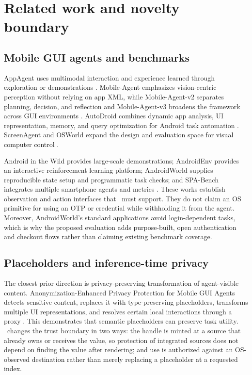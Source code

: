 \section{Related work and novelty boundary}
\label{sec:related}

\subsection{Mobile GUI agents and benchmarks}

AppAgent uses multimodal interaction and experience learned through exploration or demonstrations \cite{zhang2023appagent}. Mobile-Agent emphasizes vision-centric perception without relying on app XML, while Mobile-Agent-v2 separates planning, decision, and reflection and Mobile-Agent-v3 broadens the framework across GUI environments \cite{wang2024mobileagent,wang2024mobileagentv2,ye2025mobileagentv3}. AutoDroid combines dynamic app analysis, UI representation, memory, and query optimization for Android task automation \cite{wen2023autodroid}. ScreenAgent and OSWorld expand the design and evaluation space for visual computer control \cite{niu2024screenagent,xie2024osworld}.

Android in the Wild provides large-scale demonstrations; AndroidEnv provides an interactive reinforcement-learning platform; AndroidWorld supplies reproducible state setup and programmatic task checks; and SPA-Bench integrates multiple smartphone agents and metrics \cite{rawles2023aitw,toyama2021androidenv,rawles2024androidworld,chen2024spabench}. These works establish observation and action interfaces that \SH\ must support. They do not claim an OS primitive for using an OTP or credential while withholding it from the agent. Moreover, AndroidWorld's standard applications avoid login-dependent tasks, which is why the proposed evaluation adds purpose-built, open authentication and checkout flows rather than claiming existing benchmark coverage.

\subsection{Placeholders and inference-time privacy}

The closest prior direction is privacy-preserving transformation of agent-visible content. Anonymization-Enhanced Privacy Protection for Mobile GUI Agents detects sensitive content, replaces it with type-preserving placeholders, transforms multiple UI representations, and resolves certain local interactions through a proxy \cite{zhao2026anonymization}. This demonstrates that semantic placeholders can preserve task utility. \SH\ changes the trust boundary in two ways: the handle is minted at a source that already owns or receives the value, so protection of integrated sources does not depend on finding the value after rendering; and use is authorized against an OS-observed destination rather than merely replacing a placeholder at a requested index.

